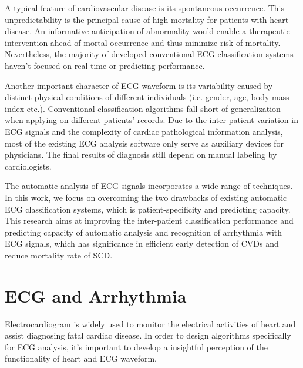 
A typical feature of cardiovascular disease is its spontaneous occurrence. This unpredictability is the principal cause of high mortality for patients with heart disease. An informative anticipation of abnormality would enable a therapeutic intervention ahead of mortal occurrence and thus minimize risk of mortality. Nevertheless, the majority of developed conventional ECG classification systems haven't focused on real-time or predicting performance. %

Another important character of ECG waveform is its variability caused by distinct physical conditions of different individuals (i.e. gender, age, body-mass index etc.)\cite{agesex}\cite{intervaria}. Conventional classification algorithms fall short of generalization when applying on different patients' records\cite{llamedo2012automatic}. Due to the inter-patient variation in ECG signals and the complexity of cardiac pathological information analysis, most of the existing ECG analysis software only serve as auxiliary devices for physicians. The final results of diagnosis still depend on manual labeling by cardiologists. %

The automatic analysis of ECG signals incorporates a wide range of techniques. In this work, we focus on overcoming the two drawbacks of existing automatic ECG classification systems, which is patient-specificity and predicting capacity. This research aims at improving the inter-patient classification performance and predicting capacity of automatic analysis and recognition of arrhythmia with ECG signals, which has significance in efficient early detection of CVDs and reduce mortality rate of SCD. 

\section{ECG and Arrhythmia}

Electrocardiogram is widely used to monitor the electrical activities of heart and assist diagnosing fatal cardiac disease. In order to design algorithms specifically for ECG analysis, it's important to develop a insightful perception of the functionality of heart and ECG waveform.  

